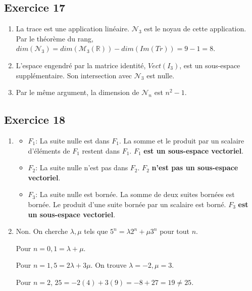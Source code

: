 \documentclass[french]{yLectureNote}
\begin{document}
\subsection{Exercice 17}
\begin{enumerate}
    \item La trace est une application linéaire. $\mathcal{N}_3$ est le noyau de cette application. Par le théorème du rang, $dim(\mathcal{N}_3)=dim(\mathcal{M}_3(\mathbb{R}))-dim(Im(Tr))=9-1=8$.
    \item L'espace engendré par la matrice identité, $Vect(I_3)$, est un sous-espace supplémentaire. Son intersection avec $\mathcal{N}_3$ est nulle.
    \item Par le même argument, la dimension de $\mathcal{N}_n$ est $n^2-1$.
\end{enumerate}

\subsection{Exercice 18}
\begin{enumerate}
    \item
    \begin{itemize}
        \item $F_1$: La suite nulle est dans $F_1$. La somme et le produit par un scalaire d'éléments de $F_1$ restent dans $F_1$. $F_1$ \textbf{est un sous-espace vectoriel}.
        \item $F_2$: La suite nulle n'est pas dans $F_2$. $F_2$ \textbf{n'est pas un sous-espace vectoriel}.
        \item $F_3$: La suite nulle est bornée. La somme de deux suites bornées est bornée. Le produit d'une suite bornée par un scalaire est borné. $F_3$ \textbf{est un sous-espace vectoriel}.
    \end{itemize}
    \item Non. On cherche $\lambda, \mu$ tels que $5^n=\lambda 2^n+\mu 3^n$ pour tout $n$.

    Pour $n=0, 1=\lambda+\mu$.

    Pour $n=1, 5=2\lambda+3\mu$. On trouve $\lambda=-2, \mu=3$.

    Pour $n=2$, $25 = -2(4)+3(9) = -8+27=19 \ne 25$.
\end{enumerate}
\end{document}
